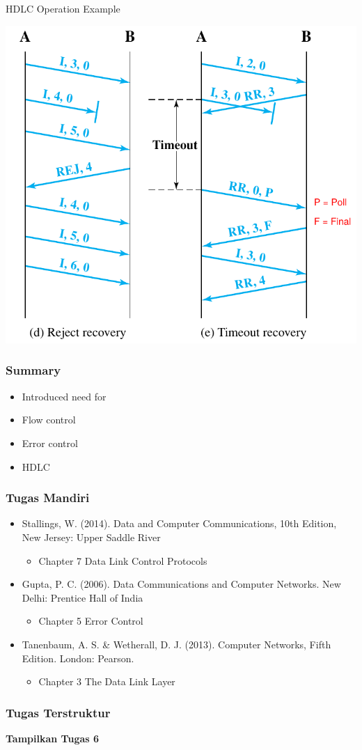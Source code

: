 \documentclass[pdflatex,compress]{beamer}
\begin{document}
\begin{frame}{HDLC Operation Example}
	\begin{center}
		\includegraphics[height=0.8\textheight]{img/img14}
	\end{center}
\end{frame}

\begin{frame}
	\frametitle{Summary}
	\begin{itemize}
		\item Introduced need for
		\item Flow control
		\item Error control
		\item HDLC
	\end{itemize}
\end{frame}

\begin{frame}
	\frametitle{Tugas Mandiri}
	\begin{itemize}
		\item Stallings, W. (2014). Data and Computer Communications, 10th Edition, New Jersey: Upper Saddle River
		\begin{itemize}
			\item Chapter 7 Data Link Control Protocols
		\end{itemize}
		\item Gupta, P. C. (2006). Data Communications and Computer Networks. New Delhi: Prentice Hall of India
		\begin{itemize}
			\item Chapter 5 Error Control
		\end{itemize}
		\item Tanenbaum, A. S. \& Wetherall, D. J. (2013). Computer Networks, Fifth Edition. London: Pearson.
		\begin{itemize}
			\item Chapter 3 The Data Link Layer
		\end{itemize}
	\end{itemize}
\end{frame}

\begin{frame}
	\frametitle{Tugas Terstruktur}
	\textbf{Tampilkan Tugas 6}
\end{frame}
\end{document}
